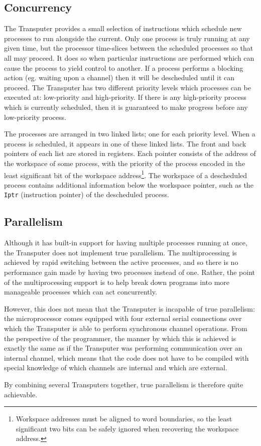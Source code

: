 \subsection{Concurrency}

The Transputer provides a small selection of instructions which schedule new
processes to run alongside the current. Only one process is truly running at any
given time, but the processor time-slices between the scheduled processes so
that all may proceed. It does so when particular instructions are performed
which can cause the process to yield control to another. If a process performs a
blocking action (eg. waiting upon a channel) then it will be descheduled until
it can proceed. The Transputer has two different priority levels which processes
can be executed at: low-priority and high-priority. If there is any
high-priority process which is currently scheduled, then it is guaranteed to
make progress before any low-priority process.

The processes are arranged in two linked lists; one for each priority level.
When a process is scheduled, it appears in one of these linked lists. The front
and back pointers of each list are stored in registers. Each pointer consists of
the address of the workspace of some process, with the priority of the process
encoded in the least significant bit of the workspace address\footnote{Workspace
addresses must be aligned to word boundaries, so the least significant two bits
can be safely ignored when recovering the workspace address.}. The workspace of
a descheduled process contains additional information below the workspace
pointer, such as the \texttt{Iptr} (instruction pointer) of the descheduled
process.

\subsection{Parallelism}

Although it has built-in support for having multiple processes running at once,
the Transputer does not implement true parallelism. The multiprocessing is
achieved by rapid switching between the active processes, and so there is no
performance gain made by having two processes instead of one. Rather, the point
of the multiprocessing support is to help break down programs into more
manageable processes which can act concurrently.

However, this does not mean that the Transputer is incapable of true
parallelism: the microprocessor comes equipped with four external serial
connections over which the Transputer is able to perform synchronous channel
operations. From the perspective of the programmer, the manner by which this is
achieved is exactly the same as if the Transputer was performing communication
over an internal channel, which means that the code does not have to be compiled
with special knowledge of which channels are internal and which are external.

By combining several Transputers together, true parallelism is therefore quite
achievable.
